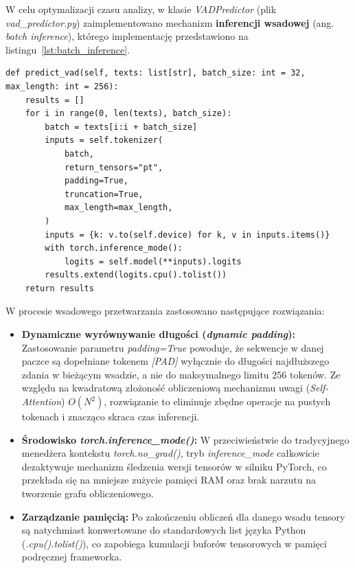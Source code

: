 W celu optymalizacji czasu analizy, w klasie \textit{VADPredictor} (plik \textit{vad\_predictor.py}) 
zaimplementowano mechanizm \textbf{inferencji wsadowej} (ang. \textit{batch inference}), 
którego implementację przedstawiono na listingu~\ref{lst:batch_inference}.

\begin{lstlisting}[style=pythonStyle, caption={Implementacja wsadowej inferencji w klasie VADPredictor}, label={lst:batch_inference}]
def predict_vad(self, texts: list[str], batch_size: int = 32, max_length: int = 256):
    results = []
    for i in range(0, len(texts), batch_size):
        batch = texts[i:i + batch_size]
        inputs = self.tokenizer(
            batch,
            return_tensors="pt",
            padding=True,
            truncation=True,
            max_length=max_length,
        )
        inputs = {k: v.to(self.device) for k, v in inputs.items()}
        with torch.inference_mode():
            logits = self.model(**inputs).logits
        results.extend(logits.cpu().tolist())
    return results
\end{lstlisting}

W procesie wsadowego przetwarzania zastosowano następujące rozwiązania:
\begin{itemize}
    \item \textbf{Dynamiczne wyrównywanie długości (\textit{dynamic padding}):} Zastosowanie 
    parametru \textit{padding=True} powoduje, że sekwencje w danej paczce są dopełniane
    tokenem \textit{[PAD]} wyłącznie do długości najdłuższego zdania w bieżącym wsadzie, a nie do
     maksymalnego limitu 256 tokenów. Ze względu na kwadratową złożoność obliczeniową
    mechanizmu uwagi (\textit{Self-Attention}) $O(N^2)$, rozwiązanie to eliminuje zbędne operacje na
     pustych tokenach i znacząco skraca czas inferencji.
    \item \textbf{Środowisko \textit{torch.inference\_mode()}:} W przeciwieństwie do tradycyjnego 
    menedżera kontekstu \textit{torch.no\_grad()}, tryb \textit{inference\_mode}
    całkowicie dezaktywuje mechanizm śledzenia wersji tensorów w silniku PyTorch, co przekłada się
    na mniejsze zużycie pamięci RAM oraz brak narzutu na tworzenie grafu obliczeniowego.
    \item \textbf{Zarządzanie pamięcią:} Po zakończeniu obliczeń dla danego wsadu tensory są 
    natychmiast konwertowane do standardowych list języka Python (\textit{.cpu().tolist()}),
    co zapobiega kumulacji buforów tensorowych w pamięci podręcznej frameworka.
\end{itemize}

